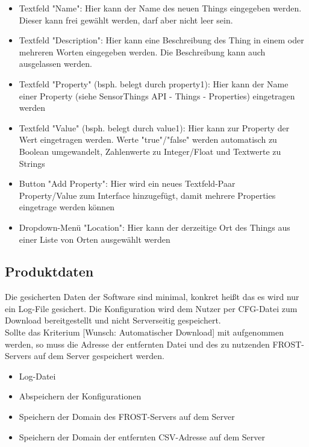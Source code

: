 \documentclass[12 pt]{article}
\begin{document}
\begin{itemize}
		\item Textfeld "Name": Hier kann der Name des neuen Things eingegeben werden. Dieser kann frei gewählt werden, darf aber nicht leer sein.
		\item Textfeld "Description": Hier kann eine Beschreibung des Thing in einem oder mehreren Worten eingegeben werden. Die Beschreibung kann auch ausgelassen werden.
		\item Textfeld "Property" (bsph. belegt durch property1): Hier kann der Name einer Property (siehe SensorThings API - Things - Properties) eingetragen werden
		\item Textfeld "Value" (bsph. belegt durch value1): Hier kann zur Property der Wert eingetragen werden. Werte "true"/"false" werden automatisch zu Boolean umgewandelt, Zahlenwerte zu Integer/Float und Textwerte zu Strings
		\item Button \string"Add Property": Hier wird ein neues Textfeld-Paar \\Property/Value zum Interface hinzugefügt, damit mehrere Properties eingetrage werden können
		\item Dropdown-Menü "Location": Hier kann der derzeitige Ort des Things aus einer Liste von Orten ausgewählt werden
	\end{itemize}
	
	
	\subsection{Produktdaten}
	Die gesicherten Daten der Software sind minimal, konkret heißt das es wird nur ein Log-File gesichert. Die Konfiguration wird dem Nutzer per CFG-Datei zum Download bereitgestellt und nicht Serverseitig gespeichert.\\
	Sollte das Kriterium [Wunsch: Automatischer Download] mit aufgenommen werden, so muss die Adresse der entfernten Datei und des zu nutzenden FROST-Servers auf dem Server gespeichert werden.
	\begin{itemize}
		\item Log-Datei
		\item Abspeichern der Konfigurationen
		\item Speichern der Domain des FROST-Servers auf dem Server
		\item Speichern der Domain der entfernten CSV-Adresse auf dem Server
	\end{itemize}
	
\end{document}
